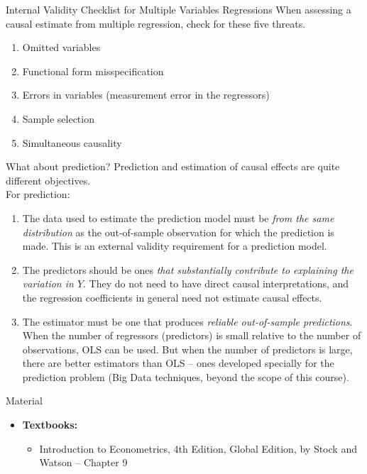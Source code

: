 \documentclass[notes,10pt, aspectratio=169]{beamer}
\begin{document}
\begin{frame}{Internal Validity Checklist for Multiple Variables Regressions}
When assessing a causal estimate from multiple regression, check for these five threats.
\begin{enumerate}
    \item Omitted variables
    \item Functional form misspecification
    \item Errors in variables (measurement error in the regressors)
    \item Sample selection
    \item Simultaneous causality
\end{enumerate}
\end{frame}

\begin{frame}{What about prediction?}
Prediction and estimation of causal effects are quite different objectives.\\[1em]
For prediction:
\begin{enumerate}
    \item The data used to estimate the prediction model must be \textit{from the same distribution} as the out-of-sample observation for which the prediction is made. This is an external validity requirement for a prediction model.
    \item The predictors should be ones \textit{that substantially contribute to explaining the variation in $Y$}. They do not need to have direct causal interpretations, and the regression coefficients in general need not estimate causal effects.
    \item The estimator must be one that produces \textit{reliable out-of-sample predictions}. When the number of regressors (predictors) is small relative to the number of observations, OLS can be used. But when the number of predictors is large, there are better estimators than OLS -- ones developed specially for the prediction problem (Big Data techniques, beyond the scope of this course).
\end{enumerate}
\end{frame}


\begin{frame}[allowframebreaks]{Material}
\begin{itemize}
    \item[--] \textbf{Textbooks:}
    \begin{itemize}
        \item Introduction to Econometrics, 4th Edition, Global Edition, by Stock and Watson -- Chapter 9
    \end{itemize}
\end{itemize}
\end{frame}
\end{document}
